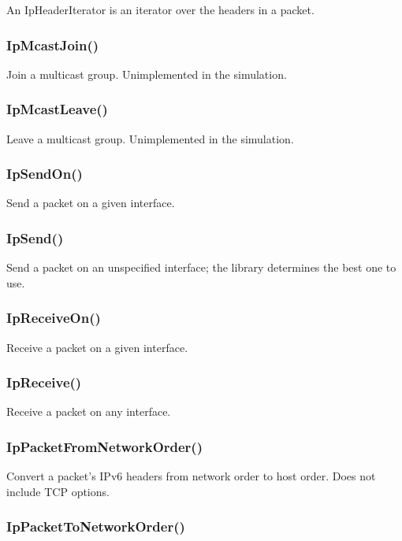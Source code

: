\documentclass{article}
\begin{document}
An IpHeaderIterator is an iterator over the headers in a packet.

\subsubsection{IpMcastJoin()}

Join a multicast group.  Unimplemented in the simulation.

\subsubsection{IpMcastLeave()}

Leave a multicast group.  Unimplemented in the simulation.

\subsubsection{IpSendOn()}

Send a packet on a given interface.

\subsubsection{IpSend()}

Send a packet on an unspecified interface; the library determines the
best one to use.

\subsubsection{IpReceiveOn()}

Receive a packet on a given interface.

\subsubsection{IpReceive()}

Receive a packet on any interface.

\subsubsection{IpPacketFromNetworkOrder()}

Convert a packet's IPv6 headers from network order to host
order.  Does not include TCP options.

\subsubsection{IpPacketToNetworkOrder()}
\end{document}

